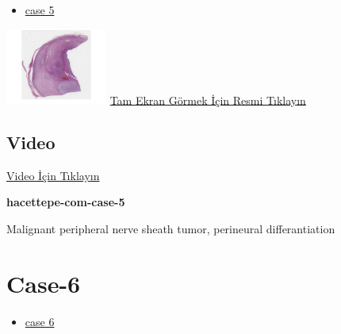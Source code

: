 \documentclass[
  letterpaper,
  DIV=11,
  numbers=noendperiod]{scrreprt}
\providecommand{\tightlist}{%
  \setlength{\itemsep}{0pt}\setlength{\parskip}{0pt}}\usepackage{longtable,booktabs,array}
\begin{document}
\begin{itemize}
\tightlist
\item
  \href{https://www.youtube.com/watch?v=o13qcP56mqg\&ab_channel=KemalKosemehmetoglu}{case
  5}
\end{itemize}

\href{https://images.patolojiatlasi.com/hacettepe-com-case-5/HE.html}{\includegraphics[width=0.25\textwidth,height=\textheight]{./screenshots/hacettepe-com-case-5_screenshot.png}}
\href{https://images.patolojiatlasi.com/hacettepe-com-case-5/HE.html}{Tam
Ekran Görmek İçin Resmi Tıklayın}

\hypertarget{video-3}{%
\subsection{Video}\label{video-3}}

\href{https://www.youtube.com/watch?v=o13qcP56mqg}{Video İçin Tıklayın}

\textbf{hacettepe-com-case-5}

\begin{tcolorbox}[enhanced jigsaw, left=2mm, toprule=.15mm, rightrule=.15mm, bottomrule=.15mm, leftrule=.75mm, colback=white, colframe=quarto-callout-tip-color-frame, toptitle=1mm, breakable, titlerule=0mm, colbacktitle=quarto-callout-tip-color!10!white, bottomtitle=1mm, title=\textcolor{quarto-callout-tip-color}{\faLightbulb}\hspace{0.5em}{Tanı}, arc=.35mm, opacitybacktitle=0.6, opacityback=0, coltitle=black]

Malignant peripheral nerve sheath tumor, perineural differantiation

\end{tcolorbox}

\hypertarget{sec-hacettepe-case-of-the-month-case-6}{%
\section{Case-6}\label{sec-hacettepe-case-of-the-month-case-6}}

\begin{itemize}
\tightlist
\item
  \href{https://www.youtube.com/watch?v=ipjRs0h1PnY\&ab_channel=KemalKosemehmetoglu}{case
  6}
\end{itemize}
\end{document}
